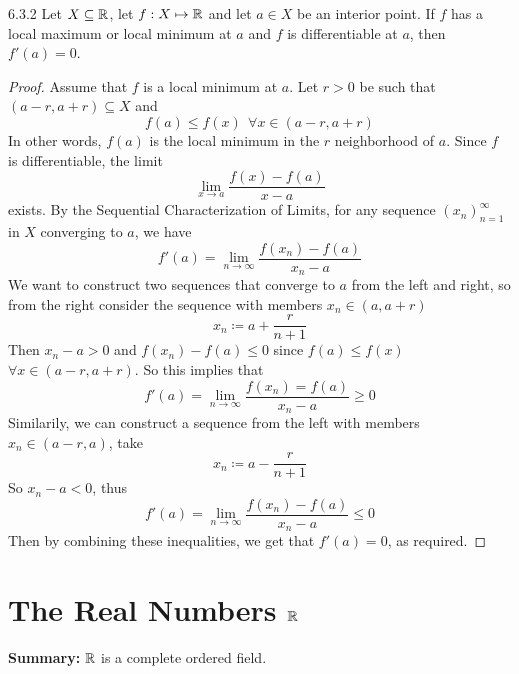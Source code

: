 \documentclass[openany]{report}
\begin{document}
\begin{manualtheorem}{6.3.2}
    Let $X \subseteq \mathbb{R}$, let $f: X \mapsto \mathbb{R}$ and let $a \in X$ be an interior point. If $f$ has a local maximum or local minimum at $a$ and $f$ is differentiable at $a$, then $f'(a) = 0$.
\end{manualtheorem}
\begin{proof}
    Assume that $f$ is a local minimum at $a$. Let $r > 0$ be such that $(a-r, a+r) \subseteq X$ and 
    \[f(a) \leq f(x) \ \ \forall x \in (a - r, a + r)\]
    In other words, $f(a)$ is the local minimum in the $r$ neighborhood of $a$. Since $f$ is differentiable, the limit 
    \[\lim_{x\rightarrow a} \frac{f(x) - f(a)}{x-a}\]
    exists. By the Sequential Characterization of Limits, for any sequence $(x_n)_{n=1}^\infty$ in $X$ converging to $a$, we have 
    \[f'(a) = \lim_{n\rightarrow\infty} \frac{f(x_n) - f(a)}{x_n - a}\]
    We want to construct two sequences that converge to $a$ from the left and right, so from the right consider the sequence with members $x_n \in (a, a+r)$
    \[x_n \coloneqq a + \frac{r}{n+1}\]
    Then $x_n - a > 0$ and $f(x_n) - f(a) \leq 0$ since $f(a) \leq f(x)$ $\forall x \in (a - r, a + r)$. So this implies that 
    \[f'(a) = \lim_{n\rightarrow \infty} \frac{f(x_n) = f(a)}{x_n-a} \geq 0\]
    Similarily, we can construct a sequence from the left with members $x_n \in (a-r, a)$, take 
    \[x_n \coloneqq a - \frac{r}{n+1}\]
    So $x_n - a < 0$, thus
    \[f'(a) = \lim_{n \rightarrow \infty} \frac{f(x_n)-f(a)}{x_n-a} \leq 0\]
    Then by combining these inequalities, we get that $f'(a) = 0$, as required.
\end{proof}

\chapter{The Real Numbers $\mathbb{R}$}
\begin{center}
    \textbf{Summary:} $\mathbb{R}$ is a complete ordered field.
\end{center}
\end{document}
